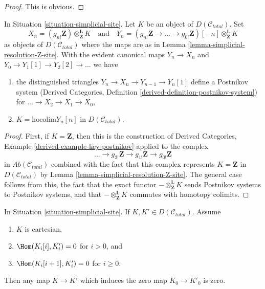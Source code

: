 \begin{proof}
This is obvious.
\end{proof}

\begin{lemma}
\label{lemma-abelian-postnikov}
In Situation \ref{situation-simplicial-site}. Let $K$ be
an object of $D(\mathcal{C}_{total})$. Set
$$
X_n = (g_{n!}\mathbf{Z})
\otimes^\mathbf{L}_\mathbf{Z} K
\quad\text{and}\quad
Y_n =
(g_{n!}\mathbf{Z} \to \ldots \to g_{0!}\mathbf{Z})[-n]
\otimes^\mathbf{L}_\mathbf{Z} K
$$
as objects of $D(\mathcal{C}_{total})$ where the maps are
as in Lemma \ref{lemma-simplicial-resolution-Z-site}.
With the evident canonical maps $Y_n \to X_n$ and
$Y_0 \to Y_1[1] \to Y_2[2] \to \ldots$ we have
\begin{enumerate}
\item the distinguished triangles $Y_n \to X_n \to Y_{n - 1} \to Y_n[1]$
define a Postnikov system
(Derived Categories, Definition \ref{derived-definition-postnikov-system})
for $\ldots \to X_2 \to X_1 \to X_0$,
\item $K = \text{hocolim} Y_n[n]$ in $D(\mathcal{C}_{total})$.
\end{enumerate}
\end{lemma}

\begin{proof}
First, if $K = \mathbf{Z}$, then this is the construction of
Derived Categories, Example \ref{derived-example-key-postnikov}
applied to the complex
$$
\ldots \to
g_{2!}\mathbf{Z} \to
g_{1!}\mathbf{Z} \to
g_{0!}\mathbf{Z}
$$
in $\textit{Ab}(\mathcal{C}_{total})$ combined with the fact that
this complex represents $K = \mathbf{Z}$ in $D(\mathcal{C}_{total})$
by Lemma \ref{lemma-simplicial-resolution-Z-site}.
The general case follows from this, the fact that the exact functor
$- \otimes^\mathbf{L}_\mathbf{Z} K$ sends Postnikov systems to
Postnikov systems, and
that $- \otimes^\mathbf{L}_\mathbf{Z} K$ commutes with homotopy colimits.
\end{proof}

\begin{lemma}
\label{lemma-nullity-cartesian-objects-derived}
In Situation \ref{situation-simplicial-site}.
If $K, K' \in D(\mathcal{C}_{total})$.
Assume
\begin{enumerate}
\item $K$ is cartesian,
\item $\Hom(K_i[i], K'_i) = 0$ for $i > 0$, and
\item $\Hom(K_i[i + 1], K'_i) = 0$ for $i \geq 0$.
\end{enumerate}
Then any map $K \to K'$ which induces the zero map $K_0 \to K'_0$ is zero.
\end{lemma}

